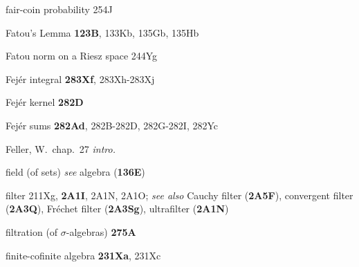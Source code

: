 fair-coin probability 254J










Fatou's Lemma {\bf 123B}, 133Kb, 135Gb, 135Hb

Fatou norm on a Riesz space 244Yg










Fej\'er integral {\bf 283Xf}, 283Xh-283Xj 


Fej\'er kernel {\bf 282D}


Fej\'er sums {\bf 282Ad}, 282B-282D, 
282G-282I, 
282Yc





Feller, W.\  chap.\ 27 {\it intro.}













field (of sets) {\it see} algebra ({\bf 136E})

filter 211Xg, {\bf 2A1I}, 2A1N, 2A1O;  
  {\it see also}
Cauchy filter ({\bf 2A5F}),
convergent filter ({\bf 2A3Q}),
Fr\'echet filter ({\bf 2A3Sg}),
ultrafilter ({\bf 2A1N})









filtration (of $\sigma$-algebras) {\bf 275A}











finite-cofinite algebra {\bf 231Xa}, 231Xc


















